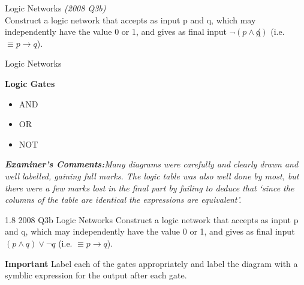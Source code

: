 \documentclass{beamer}
\begin{document}
\begin{frame}

{Logic Networks }
\emph{(2008 Q3b)}\\
Construct a logic network that accepts as input p and q, which may independently have the value 0 or 1, and
gives as final input $\neg(p \wedge \not q)$ (i.e. $\equiv p \rightarrow q$).\\
\end{frame}
\begin{frame}

{Logic Networks }

\textbf{Logic Gates}
\begin{itemize}
\item AND
\item OR
\item NOT
\end{itemize}
\end{frame}
\begin{frame}

\emph{\textbf{Examiner's Comments:}Many
diagrams were carefully and clearly drawn and well labelled, gaining full
marks. The logic table was also well done by most, but there were a few marks
lost in the final part by failing to deduce that ‘since the columns of the table are
identical the expressions are equivalent’.}
\end{frame}
\begin{frame}
{1.8 2008 Q3b Logic Networks }
Construct a logic network that accepts as input p and q, which may independently have the value 0 or 1, and
gives as final input $(p \wedge  q) \vee \neg q$ (i.e. $\equiv p \rightarrow q$).



\textbf{Important} Label each of the gates appropriately and label the diagram with a symblic expression for the output after each gate.

\end{frame}
\end{document}
